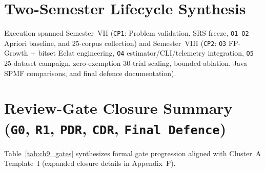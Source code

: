 \begingroup
\linespread{1.03}\selectfont
\setlength{\parskip}{0.8pt}
\titlespacing*{\section}{0pt}{3pt}{0.5pt}
\section{Two-Semester Lifecycle Synthesis}
Execution spanned Semester~VII (\texttt{CP1}: Problem validation, SRS freeze, \texttt{O1}--\texttt{O2} Apriori baseline, and 25-corpus collection) and Semester~VIII (\texttt{CP2}: \texttt{O3} FP-Growth + bitset Eclat engineering, \texttt{O4} estimator/CLI/telemetry integration, \texttt{O5} 25-dataset campaign, zero-exemption 30-trial scaling, bounded ablation, Java SPMF comparisons, and final defence documentation).

\section{Review-Gate Closure Summary (\texttt{G0}, \texttt{R1}, \texttt{PDR}, \texttt{CDR}, \texttt{Final Defence})}
Table~\ref{tab:ch9_gates} synthesizes formal gate progression aligned with Cluster~A Template~I (expanded closure details in Appendix~F).


